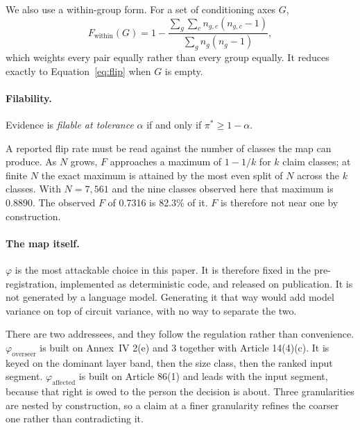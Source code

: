 \documentclass[letterpaper]{article} %
\begin{document}
We also use a within-group form. For a set of conditioning axes $G$,
\begin{equation}
F_{\text{within}}(G) = 1 - \frac{\sum_g \sum_c n_{g,c}(n_{g,c}-1)}{\sum_g n_g(n_g-1)},
\label{eq:within}
\end{equation}
which weights every pair equally rather than every group equally. It reduces
exactly to Equation~\ref{eq:flip} when $G$ is empty.

\paragraph{Filability.}
Evidence is \emph{filable at tolerance} $\alpha$ if and only if
$\pi^{*} \geq 1 - \alpha$.

A reported flip rate must be read against the number of classes the map can
produce. As $N$ grows, $F$ approaches a maximum of $1 - 1/k$ for $k$ claim
classes; at finite $N$ the exact maximum is attained by the most even split of
$N$ across the $k$ classes. With $N = 7{,}561$ and the nine classes observed
here that maximum is 0.8890. The observed $F$ of 0.7316 is 82.3\% of it. $F$ is
therefore not near one by construction.

\paragraph{The map itself.}
$\varphi$ is the most attackable choice in this paper. It is therefore fixed in
the pre-registration, implemented as deterministic code, and released on
publication. It is not generated by a language model. Generating it that way
would add model variance on top of circuit variance, with no way to separate the
two.

There are two addressees, and they follow the regulation rather than
convenience. $\varphi_{\text{overseer}}$ is built on Annex~IV 2(e) and 3
together with Article 14(4)(c). It is keyed on the dominant layer band, then the
size class, then the ranked input segment. $\varphi_{\text{affected}}$ is built
on Article 86(1) and leads with the input segment, because that right is owed to
the person the decision is about. Three granularities are nested by
construction, so a claim at a finer granularity refines the coarser one rather
than contradicting it.
\end{document}
